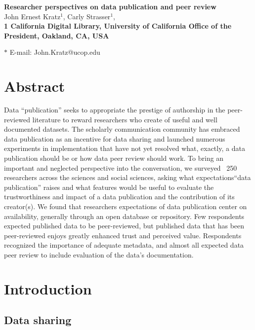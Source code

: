 \documentclass[10pt]{article}
\date{}
\begin{document}
\begin{flushleft}
{\Large
\textbf{Researcher perspectives on data publication and peer review}
}
\\
John Ernest Kratz$^{1}$, 
Carly Strasser$^{1}$, 
\\
\bf{1} California Digital Library, University of California Office of the President, Oakland, CA, USA

$\ast$ E-mail: John.Kratz@ucop.edu
\end{flushleft}


\section*{Abstract}

Data ``publication'' seeks to appropriate the prestige of authorship in the peer-reviewed literature to reward researchers who create of useful and well documented datasets. 
The scholarly communication community has embraced data publication as an incentive for data sharing and launched numerous experiments in implementation that have not yet resolved what, exactly, a data publication should be or how data peer review should work. 
To bring an important and neglected perspective into the conversation, we surveyed ~250 researchers across the sciences and social sciences, asking what expectations``data publication'' raises and what features would be useful to evaluate the trustworthiness and impact of a data publication and the contribution of its creator(s).  
We found that researchers expectations of data publication center on availability, generally through an open database or repository.
Few respondents expected published data to be peer-reviewed, but published data that has been peer-reviewed enjoys greatly enhanced trust and perceived value.
Respondents recognized the importance of adequate metadata, and almost all expected data peer review to include evaluation of the data's documentation.


\section*{Introduction}

\subsection*{Data sharing}
\end{document}
